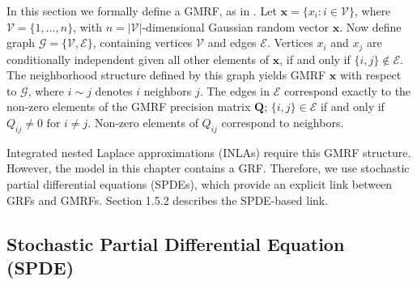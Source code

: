 In this section we formally define a GMRF, as in \citep{Rue2007}. Let $\pmb{x} = \{ x_{i}:i \in \mathscr{V} \}$, where $\mathscr{V} = \{1,\dots,n\}$, with $n = |\mathscr{V}|$-dimensional Gaussian random vector $\pmb{x}$. Now define graph $\mathscr{G} = \{ \mathscr{V}, \mathscr{E} \}$, containing vertices $\mathscr{V}$ and edges $\mathscr{E}$. Vertices $x_{i}$ and $x_{j}$ are conditionally independent given all other elements of $\pmb{x}$, if and only if $\{i, j\} \notin \mathscr{E}$. The neighborhood structure defined by this graph yields GMRF $\pmb{x}$ with respect to $\mathscr{G}$, where $i \sim j$ denotes $i$ neighbors $j$. The edges in $\mathscr{E}$ correspond exactly to the non-zero elements of the GMRF precision matrix $\pmb{Q}$; $\{ i, j \} \in \mathscr{E}$ if and only if $Q_{ij} \neq 0 \text{ for } i \neq j$. Non-zero elements of $Q_{ij}$ correspond to neighbors.




Integrated nested Laplace approximations (INLAs) require this GMRF structure. However, the model in this chapter contains a GRF. Therefore, we use stochastic partial differential equations (SPDEs), which provide an explicit link between GRFs and GMRFs. Section 1.5.2 describes the SPDE-based link. 

\subsection{Stochastic Partial Differential Equation (SPDE)} 

